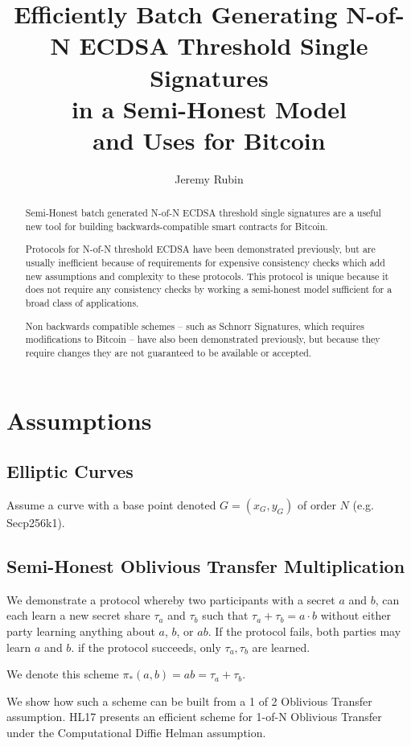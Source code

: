 \documentclass{article}
\author{Jeremy Rubin}
\title{Efficiently Batch Generating N-of-N ECDSA Threshold Single Signatures\\ in a Semi-Honest Model\\ and Uses for Bitcoin}
\newcommand{\mulOT}{\pi_{*}}
\begin{document}
\maketitle

\begin{abstract}
Semi-Honest batch generated N-of-N ECDSA threshold single signatures are a useful new tool for building backwards-compatible smart contracts for Bitcoin.

Protocols for N-of-N threshold ECDSA have been demonstrated previously, but are usually inefficient because of requirements for expensive consistency checks which add new assumptions and complexity to these protocols. This protocol is unique because it does not require any consistency checks by working a semi-honest model sufficient for a broad class of applications.

Non backwards compatible schemes -- such as Schnorr Signatures, which requires modifications to Bitcoin -- have also been demonstrated previously, but because they require changes they are not guaranteed to be available or accepted.
\end{abstract}

\section{Assumptions}


\subsection{Elliptic Curves}

Assume a curve with a base point denoted $G = (x_G, y_G)$ of order $N$ (e.g. Secp256k1).



\subsection{Semi-Honest Oblivious Transfer Multiplication}

We demonstrate a protocol whereby two participants with a secret $a$ and $b$, can each learn a new secret share $\tau_a$ and $\tau_b$ such that $\tau_a + \tau_b = a\cdot b$ without either party learning anything about $a$, $b$, or $ab$. If the protocol fails, both parties may learn $a$ and $b$. if the protocol succeeds, only $\tau_a, \tau_b$ are learned.

We denote this scheme $\mulOT(a,b) = ab = \tau_a + \tau_b$.

We show how such a scheme can be built from a 1 of 2 Oblivious Transfer assumption.  HL17 presents an efficient scheme for 1-of-N Oblivious Transfer under the Computational Diffie Helman assumption.
\end{document}
